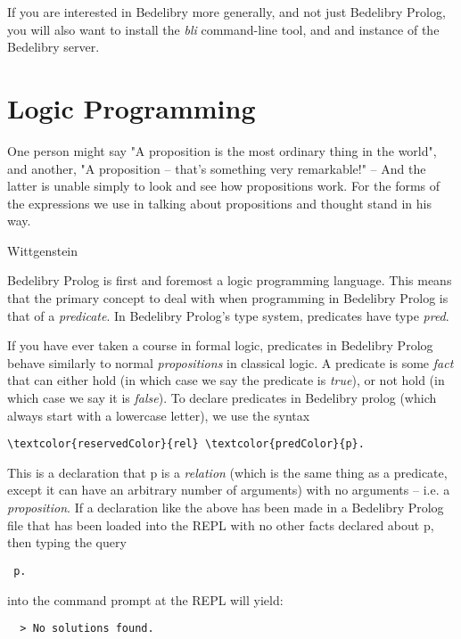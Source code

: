 \documentclass{book}
\begin{document}
If you are interested in Bedelibry more generally, and not just Bedelibry Prolog, you will also want to install the \textit{bli} command-line tool, and and instance of the Bedelibry server. 

\chapter{Logic Programming}

\epigraph{One person might say "A proposition is the most ordinary thing in the world", and another, "A proposition -- that's something very remarkable!" -- And the latter is unable simply to look and see how propositions work. For the forms of the expressions we use in talking about propositions and thought stand in his way.}{Wittgenstein}

Bedelibry Prolog is first and foremost a logic programming language. This means that the primary concept to deal with when programming in Bedelibry Prolog is that of a \textit{predicate}. In Bedelibry Prolog's type system, predicates have type \textit{pred}. 

If you have ever taken a course in formal logic, predicates in Bedelibry Prolog behave similarly to normal \textit{propositions} in classical logic. A predicate is some \textit{fact} that can either hold (in which case we say the predicate is \textit{true}), or not hold (in which case we say it is \textit{false}). To declare predicates in Bedelibry prolog (which always start with a lowercase letter), we use the syntax

\begin{Verbatim}[commandchars=\\\{\}]
  \textcolor{reservedColor}{rel} \textcolor{predColor}{p}.
\end{Verbatim}

This is a declaration that p is a \textit{relation} (which is the same thing as a predicate, except it can have an arbitrary number of arguments) with no arguments -- i.e. a \textit{proposition}. If a declaration like the above has been made in a Bedelibry Prolog file that has been loaded into the REPL with no other facts declared about p, then typing the query \begin{verbatim} p. \end{verbatim} into the command prompt at the REPL will yield:

\begin{verbatim}
  > No solutions found.
\end{verbatim}
\end{document}
